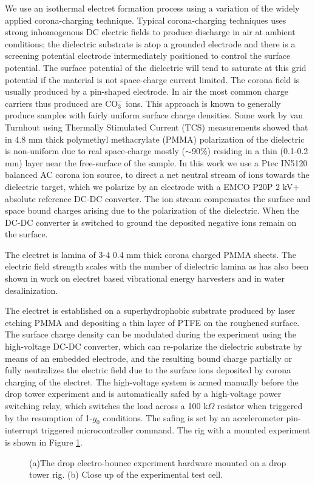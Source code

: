 \documentclass[12pt,a4paper,oneside]{book}
\begin{document}
We use an isothermal electret formation process using a variation of the widely applied corona-charging technique. Typical corona-charging techniques uses strong inhomogenous DC electric fields to produce discharge in air at ambient conditions; the dielectric substrate is atop a grounded electrode and there is a screening potential electrode intermediately positioned to control the surface potential. The surface potential of the dielectric will tend to saturate at this grid potential if the material is not space-charge current limited. The corona field is usually produced by a pin-shaped electrode. In air the most common charge carriers thus produced are $\mbox{CO}_3^-$ ions. This approach is known to generally produce samples with fairly uniform surface charge densities. Some work\cite{van_turnhout_thermally_1975} by van Turnhout using Thermally Stimulated Current (TCS) measurements showed that in 4.8 mm thick polymethyl methacrylate (PMMA) polarization of the dielectric is non-uniform due to real space-charge mostly ($\sim$90\%) residing in a thin (0.1-0.2 mm) layer near the free-surface of the sample. In this work we use a Ptec IN5120 balanced AC corona ion source, to direct a net neutral stream of ions towards the dielectric target, which we polarize by an electrode with a EMCO P20P $2$ kV$+$ absolute reference DC-DC converter. The ion stream compensates the surface and space bound charges arising due to the polarization of the dielectric. When the DC-DC converter is switched to ground the deposited negative ions remain on the surface. 

The electret is lamina of 3-4 0.4 mm thick corona charged PMMA sheets. The electric field strength scales with the number of dielectric lamina as has also been shown in work on electret based vibrational energy harvesters\cite{wada_stacking_2012} and in water desalinization\cite{ni_desalination_2005}. 

The electret is established on a superhydrophobic substrate produced by laser etching PMMA and depositing a thin layer of PTFE on the roughened surface. The surface charge density can be modulated during the experiment using the high-voltage DC-DC converter, which can re-polarize the dielectric substrate by means of an embedded electrode, and the resulting bound charge partially or fully neutralizes the electric field due to the surface ions deposited by corona charging of the electret. The high-voltage system is armed manually before the drop tower experiment and is automatically safed by a high-voltage power switching relay, which switches the load across a 100 k$\Omega$ resistor when triggered by the resumption of 1-$g_0$ conditions. The safing is set by an accelerometer pin-interrupt triggered microcontroller command. The rig with a mounted experiment is shown in Figure \ref{fig:rig}. 
\begin{figure}
    \centering
    \def\svgwidth{\columnwidth}
        \subfloat[]{%
}

    \caption{(a)The drop electro-bounce experiment hardware mounted on a drop tower rig. (b) Close up of the experimental test cell.\label{fig:rig}}
\end{figure}
\end{document}
